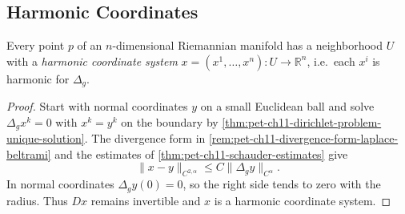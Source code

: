 \subsection{Harmonic Coordinates}

\begin{lemma}
  \label{lem:pet-ch11-harmonic-coordinates-exist}

  Every point $p$ of an $n$-dimensional Riemannian manifold has a neighborhood
  $U$ with a \emph{harmonic coordinate system}
  $x=(x^1,\dots,x^n):U\to\mathbb{R}^n$, i.e.\ each $x^i$ is harmonic for
  $\Delta_g$.
\end{lemma}
\begin{proof}
  \sketch
  Start with normal coordinates \(y\) on a small Euclidean ball and solve
  \(\Delta_gx^k=0\) with \(x^k=y^k\) on the boundary by
  \cref{thm:pet-ch11-dirichlet-problem-unique-solution}. The divergence form
  in \cref{rem:pet-ch11-divergence-form-laplace-beltrami} and the estimates
  of \cref{thm:pet-ch11-schauder-estimates} give
  \[
    \|x-y\|_{C^{2,\alpha}}\le C\|\Delta_gy\|_{C^\alpha}.
  \]
  In normal coordinates \(\Delta_gy(0)=0\), so the right side tends to zero with the radius. Thus \(Dx\) remains invertible and \(x\) is a harmonic coordinate system.
\end{proof}


